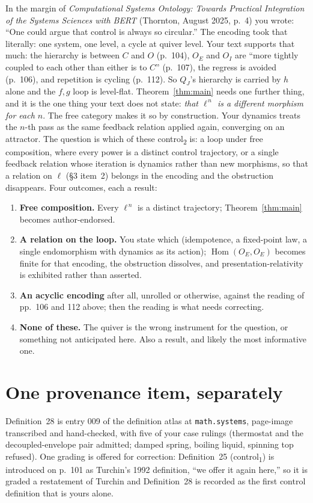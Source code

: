 \documentclass[10pt]{article}
\theoremstyle{remark}
\newcommand{\Hom}{\operatorname{Hom}}
\newcommand{\ctrl}[1]{control\textsubscript{#1}}
\begin{document}
In the margin of \emph{Computational Systems Ontology: Towards Practical Integration of the Systems Sciences with BERT} (Thornton, August 2025, p.~4) you wrote: ``One could argue that control is always so circular.'' The encoding took that literally: one system, one level, a cycle at quiver level. Your text supports that much: the hierarchy is between $C$ and $O$ (p.~104), $O_E$ and $O_I$ are ``more tightly coupled to each other than either is to $C$'' (p.~107), the regress is avoided (p.~106), and repetition is cycling (p.~112). So $Q_J$'s hierarchy is carried by $h$ alone and the $f,g$ loop is level-flat. Theorem~\ref{thm:main} needs one further thing, and it is the one thing your text does not state: \emph{that $\ell^{\,n}$ is a different morphism for each $n$}. The free category makes it so by construction. Your dynamics treats the $n$-th pass as the same feedback relation applied again, converging on an attractor. The question is which of these \ctrl{2} is: a loop under free composition, where every power is a distinct control trajectory, or a single feedback relation whose iteration is dynamics rather than new morphisms, so that a relation on $\ell$ (\S3 item~2) belongs in the encoding and the obstruction disappears. Four outcomes, each a result:
\begin{enumerate}[leftmargin=1.4em,itemsep=1pt]
\item \textbf{Free composition.} Every $\ell^{\,n}$ is a distinct trajectory; Theorem~\ref{thm:main} becomes author-endorsed.
\item \textbf{A relation on the loop.} You state which (idempotence, a fixed-point law, a single endomorphism with dynamics as its action); $\Hom(O_E,O_E)$ becomes finite for that encoding, the obstruction dissolves, and presentation-relativity is exhibited rather than asserted.
\item \textbf{An acyclic encoding} after all, unrolled or otherwise, against the reading of pp.~106 and 112 above; then the reading is what needs correcting.
\item \textbf{None of these.} The quiver is the wrong instrument for the question, or something not anticipated here. Also a result, and likely the most informative one.
\end{enumerate}

\section{One provenance item, separately}

Definition~28 is entry 009 of the definition atlas at \texttt{math.systems}, page-image transcribed and hand-checked, with five of your case rulings (thermostat and the decoupled-envelope pair admitted; damped spring, boiling liquid, spinning top refused). One grading is offered for correction: Definition~25 (\ctrl{1}) is introduced on p.~101 as Turchin's 1992 definition, ``we offer it again here,'' so it is graded a restatement of Turchin and Definition~28 is recorded as the first control definition that is yours alone.
\end{document}
